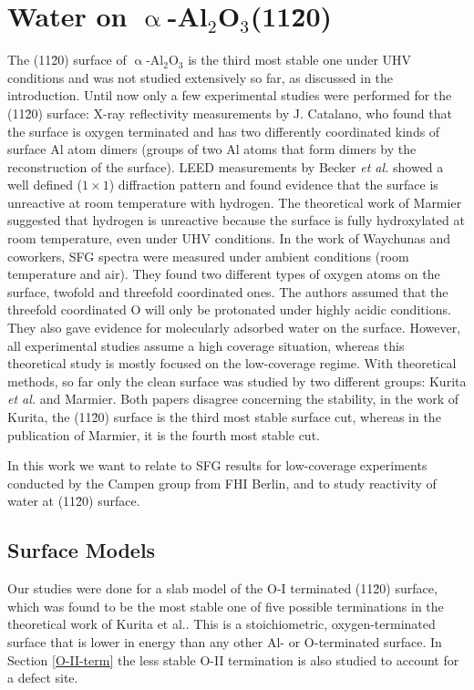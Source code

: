 \documentclass[11pt,DIV=13,BCOR=5mm,a4paper,headinclude]{scrbook}
\newcommand\todo[1]{\textcolor{red}{TODO: \textit{{#1}}}}
\begin{document}
\chapter[Water on $\upalpha$-Al$_2$O$_3$(11\=20)]{Water on $\upalpha$-Al$_2$O$_3$(11\=20)\cite{Heiden11-20_2018}}\label{sec:11-20}

The (11\=20) surface of $\upalpha$-Al$_2$O$_3$ is the third most stable one under UHV conditions and was not studied extensively so far, as discussed in the introduction.
Until now only a few experimental studies were performed for the (11\=20) surface: X-ray reflectivity measurements by J. Catalano\cite{catalano}, who found that the surface is oxygen terminated and has two differently coordinated kinds of surface Al atom dimers (groups of two Al atoms that form dimers by the reconstruction of the surface).
LEED measurements by Becker \textit{et al.}\cite{Becker2002} showed a well defined ($1\times 1$) diffraction pattern and found evidence that the surface is unreactive at room temperature with hydrogen.
The theoretical work of Marmier\cite{marmier} suggested that hydrogen is unreactive because the surface is fully hydroxylated at room temperature, even under UHV conditions.
In the work of Waychunas and coworkers\cite{sung}, SFG spectra were measured under ambient conditions (room temperature and air).
They found two different types of oxygen atoms on the surface, twofold and threefold coordinated ones.
The authors assumed that the threefold coordinated O will only be protonated under highly acidic conditions.
They also gave evidence for molecularly adsorbed water on the surface.
However, all experimental studies\cite{catalano,sung,Becker2002} assume a high coverage situation, whereas this theoretical study is mostly focused on the low-coverage regime.
With theoretical methods, so far only the clean surface was studied by two different groups: Kurita \textit{et al.}\cite{kuri10} and Marmier\cite{marmier}.
Both papers disagree concerning the stability, in the work of Kurita, the (11\=20) surface is the third most stable surface cut, whereas in the publication of Marmier, it is the fourth most stable cut.

In this work we want to relate to SFG results for low-coverage experiments conducted by the Campen group from FHI Berlin, and to study reactivity of water at (11\=20) surface. %
\section{Surface Models}
Our studies were done for a slab model of the O-I terminated (11\=20) surface, which was found to be the most stable one of five possible terminations in the theoretical work of Kurita et al.\cite{kuri10}.
This is a stoichiometric, oxygen-terminated surface that is lower in energy than any other Al- or O-terminated surface.
In Section \ref{O-II-term} the less stable O-II termination is also studied to account for a defect site.
\end{document}
